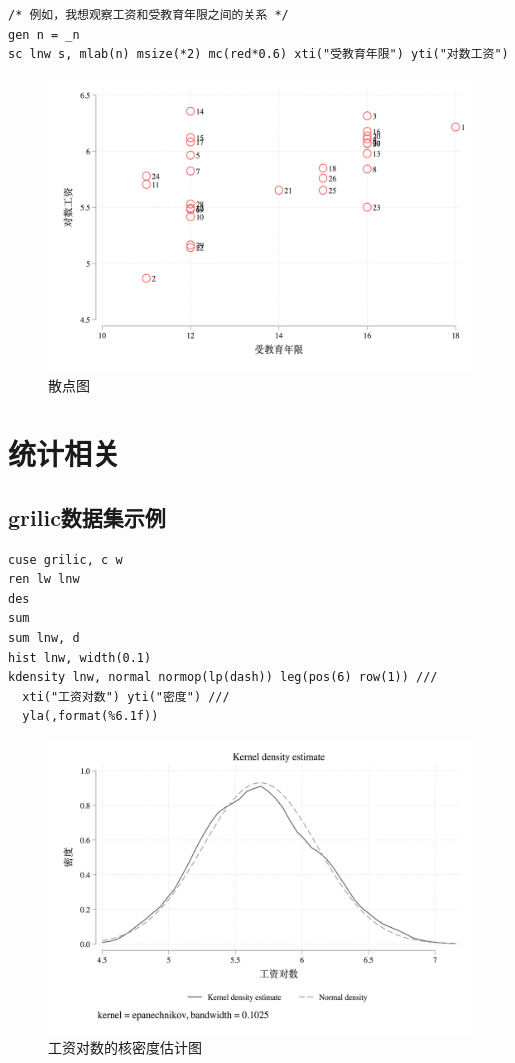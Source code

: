 \begin{lstlisting}
/* 例如，我想观察工资和受教育年限之间的关系 */
gen n = _n
sc lnw s, mlab(n) msize(*2) mc(red*0.6) xti("受教育年限") yti("对数工资")
\end{lstlisting}

\begin{figure}[htbp]
  \centering \includegraphics[width=\textwidth]{assets/scatter.png}
  \caption{散点图}
  \label{fig:scatter}
\end{figure}

\section{统计相关}
\subsection{grilic数据集示例}
\begin{lstlisting}
cuse grilic, c w
ren lw lnw
des
sum
sum lnw, d
hist lnw, width(0.1)
kdensity lnw, normal normop(lp(dash)) leg(pos(6) row(1)) ///
  xti("工资对数") yti("密度") ///
  yla(,format(%6.1f))
\end{lstlisting}

\begin{figure}[htbp]
  \centering \includegraphics[width=\textwidth]{assets/kden.png}
  \caption{工资对数的核密度估计图}\label{fig:kden}
\end{figure}

